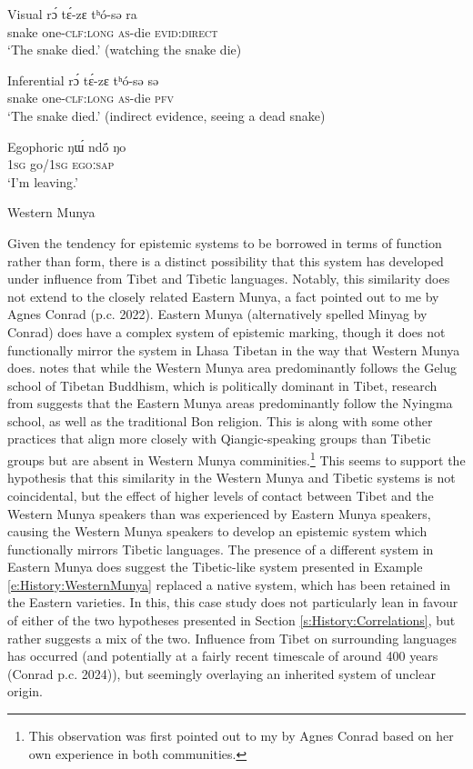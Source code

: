 \begin{exe}
    \ex\label{e:History:WesternMunya}
    \begin{xlist}
\ex Visual
\gll rɔ́ tɛ́-zɛ tʰó-sə ra \\
snake one-\textsc{clf:long} \textsc{as}-die \textsc{evid:direct} \\
\glt ‘The snake died.’ (watching the snake die)

\ex Inferential
\gll rɔ́ tɛ́-zɛ tʰó-sə sə \\
snake one-\textsc{clf:long} \textsc{as}-die \textsc{pfv} \\
\glt ‘The snake died.’ (indirect evidence, seeing a dead snake)

\ex Egophoric
\gll ŋɯ́ ndö́ ŋo \\
\textsc{1sg} go/\textsc{1sg} \textsc{egoːsap} \\
\glt ‘I’m leaving.’
    \end{xlist}
Western Munya \cite[Qiangic: PRC,][241, 247]{Bai2019}
\end{exe}

Given the tendency for epistemic systems to be borrowed in terms of function rather than form, there is a distinct possibility that this system has developed under influence from Tibet and Tibetic languages. Notably, this similarity does not extend to the closely related Eastern Munya, a fact pointed out to me by Agnes Conrad (p.c. 2022). Eastern Munya (alternatively spelled Minyag by Conrad) does have a complex system of epistemic marking, though it does not functionally mirror the system in Lhasa Tibetan in the way that Western Munya does. \cite{Bai2019} notes that while the Western Munya area predominantly follows the Gelug school of Tibetan Buddhism, which is politically dominant in Tibet, research from \cite{Li2006} suggests that the Eastern Munya areas predominantly follow the Nyingma school, as well as the traditional Bon religion. This is along with some other practices that align more closely with Qiangic-speaking groups than Tibetic groups but are absent in Western Munya comminities.\footnote{This observation was first pointed out to my by Agnes Conrad based on her own experience in both communities.} This seems to support the hypothesis that this similarity in the Western Munya and Tibetic systems is not coincidental, but the effect of higher levels of contact between Tibet and the Western Munya speakers than was experienced by Eastern Munya speakers, causing the Western Munya speakers to develop an epistemic system which functionally mirrors Tibetic languages. The presence of a different system in Eastern Munya does suggest the Tibetic-like system presented in Example \ref{e:History:WesternMunya} replaced a native system, which has been retained in the Eastern varieties. In this, this case study does not particularly lean in favour of either of the two hypotheses presented in Section \ref{s:History:Correlations}, but rather suggests a mix of the two. Influence from Tibet on surrounding languages has occurred (and potentially at a fairly recent timescale of around 400 years (Conrad p.c. 2024)), but seemingly overlaying an inherited system of unclear origin.

